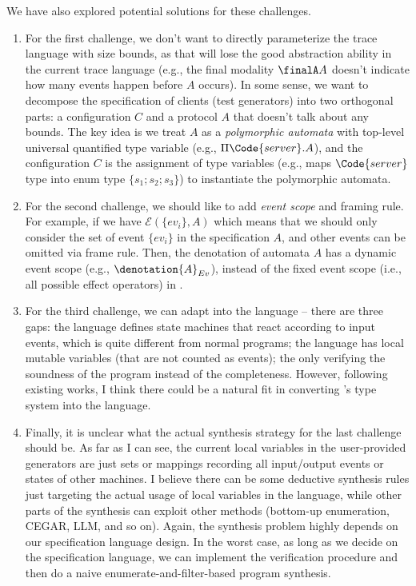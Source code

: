 We have also explored potential solutions for these challenges. 
\begin{enumerate}
    \item For the first challenge, we don't want to directly parameterize the trace language with size bounds, as that will lose the good abstraction ability in the current trace language (e.g., the final modality $\finalA A$ doesn't indicate how many events happen before $A$ occurs). In some sense, we want to decompose the specification of clients (test generators) into two orthogonal parts: a configuration $C$ and a protocol $A$ that doesn't talk about any bounds. The key idea is we treat $A$ as a \emph{polymorphic automata} with top-level universal quantified type variable (e.g., $\Pi \Code{server}.A$), and the configuration $C$ is the assignment of type variables (e.g., maps $\Code{server}$ type into enum type $\{s_1; s_2; s_3\}$) to instantiate the polymorphic automata.
    \item For the second challenge, we should like to add \emph{event scope} and framing rule. For example, if we have $\mathcal{E}(\{ev_i\}, A)$
    which means that we should only consider the set of event $\{ev_i\}$ in the specification $A$, and other events can be omitted via frame rule. Then, the denotation of automata $A$ has a dynamic event scope (e.g., $\denotation{A}_{Ev}$), instead of the fixed event scope (i.e., all possible effect operators) in .
    \item For the third challenge, we can adapt  into the  language -- there are three gaps: the  language defines state machines that react according to input events, which is quite different from normal programs; the  language has local mutable variables (that are not counted as events); the  only verifying the soundness of the program instead of the completeness. However, following existing works, I think there could be a natural fit in converting 's type system into the  language.
    \item Finally, it is unclear what the actual synthesis strategy for the last challenge should be. As far as I can see, the current local variables in the user-provided generators are just sets or mappings recording all input/output events or states of other machines. I believe there can be some deductive synthesis rules just targeting the actual usage of local variables in the  language, while other parts of the synthesis can exploit other methods (bottom-up enumeration, CEGAR, LLM, and so on). Again, the synthesis problem highly depends on our specification language design. In the worst case, as long as we decide on the specification language, we can implement the verification procedure and then do a naive enumerate-and-filter-based program synthesis.
\end{enumerate}

